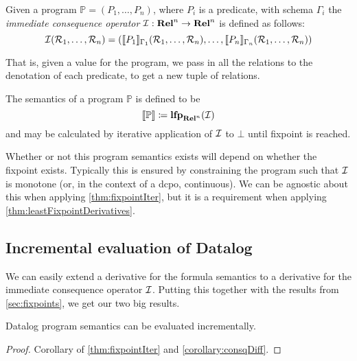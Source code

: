 \begin{defn}
  Given a program $\mathbb{P} = (P_1, \dots, P_n)$, where $P_i$ is a predicate,
  with schema $\Gamma_i$ the \emph{immediate consequence operator} $\mathcal{I}: \mathbf{Rel}^n \rightarrow \mathbf{Rel}^n$ is defined 
  as follows:
  \begin{displaymath}
    \mathcal{I}(\mathcal{R}_1, \dots, \mathcal{R}_n) 
    = (\llbracket P_1 \rrbracket_{\Gamma_1}(\mathcal{R}_1, \dots, \mathcal{R}_n), \dots, \llbracket P_n \rrbracket_{\Gamma_n}(\mathcal{R}_1, \dots, \mathcal{R}_n))
  \end{displaymath}
\end{defn}

That is, given a value for the program, we pass in all the relations
to the denotation of each predicate, to get a new tuple of relations.

\begin{defn}
  The semantics of a program $\mathbb{P}$ is defined to be
  \begin{displaymath}
    \llbracket \mathbb{P} \rrbracket \coloneqq \mathbf{lfp}_{\mathbf{Rel}^n}(\mathcal{I})
  \end{displaymath}
  and may be calculated by iterative application of $\mathcal{I}$ to $\bot$ until
  fixpoint is reached.
\end{defn}

Whether or not this program semantics exists will depend on whether the fixpoint
exists. Typically this is ensured by constraining the program such that $\mathcal{I}$
is monotone (or, in the context of a dcpo, continuous). We can be agnostic
about this when applying \cref{thm:fixpointIter}, but it is a requirement when
applying \cref{thm:leastFixpointDerivatives}.

\subsection{Incremental evaluation of Datalog}
\label{sec:datalogIncr}

We can easily extend a derivative for the formula semantics to a derivative for
the immediate consequence operator $\mathcal{I}$. Putting this together with the
results from \cref{sec:fixpoints}, we get our two big results.

\begin{corollary}
\label{thm:diffEval}
  Datalog program semantics can be evaluated incrementally.
\end{corollary}
\ifproofs
\begin{proof}
  Corollary of \cref{thm:fixpointIter} and \cref{corollary:consqDiff}.
\end{proof}
\fi

